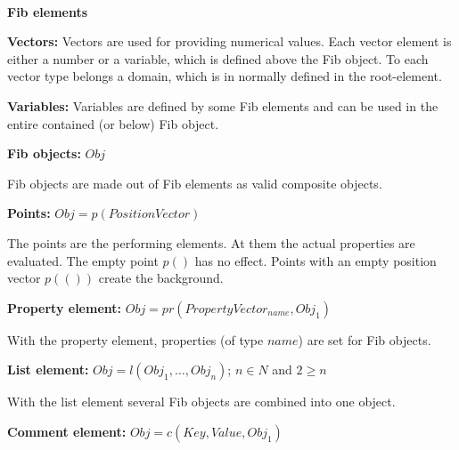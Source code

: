 \documentclass[10pt,a4paper]{article}
\begin{document}





\ \vspace{-2.5cm}
\begin{center}
	\LARGE\bf Fib elements
\end{center}

\bigskip\noindent
\textbf{Vectors:} Vectors are used for providing numerical values. Each vector element is either a number or a variable, which is defined above the Fib object. To each vector type belongs a domain, which is in normally defined in the root-element.

\bigskip\noindent
\textbf{Variables:} Variables are defined by some Fib elements and can be used in the entire contained (or below) Fib object.

\bigskip\noindent
\textbf{Fib objects:} $Obj$

Fib objects are made out of Fib elements as valid composite objects.

\bigskip\noindent
\textbf{Points:} $Obj = p( PositionVector )$

The points are the performing elements. At them the actual properties are evaluated. The empty point $p()$ has no effect. Points with an empty position vector $p(())$ create the background.


\bigskip\noindent
\textbf{Property element:} $Obj = pr( PropertyVector_{name}, Obj_1 )$

With the property element, properties (of type $name$) are set for Fib objects.


\bigskip\noindent
\textbf{List element:} $Obj = l( Obj_1, \ldots, Obj_n )$; $n \in N$ and $2 \geq n$

With the list element several Fib objects are combined into one object.


\bigskip\noindent
\textbf{Comment element:} $Obj = c( Key , Value , Obj_1)$
\end{document}
